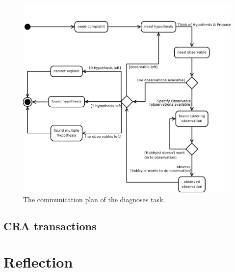 \documentclass[a4paper,10pt]{article}
\begin{document}
\begin{figure}[htbp]
	\centering
		\includegraphics[width=1.00\textwidth]{communicationPlan.pdf}
	\caption{The communication plan of the diagnoses task.}
	\label{fig:communicationPlan}
\end{figure}

\subsection{CRA transactions}



\section{Reflection}
\end{document}
